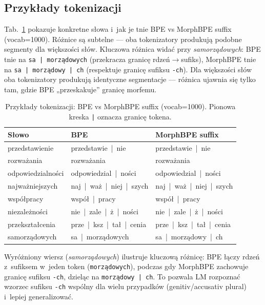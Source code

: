 \subsection*{Przykłady tokenizacji}
Tab.~\ref{tab:examples} pokazuje konkretne słowa i~jak je tnie
BPE vs MorphBPE suffix (vocab=1000). Różnice są subtelne --- oba
tokenizatory produkują podobne segmenty dla większości słów.
Kluczowa różnica widać przy \emph{samorządowych}:
BPE tnie na \texttt{sa~|~morządowych} (przekracza granicę
rdzeń$\to$sufiks), MorphBPE tnie na \texttt{sa~|~morządowy~|~ch}
(respektuje granicę sufiksu \texttt{-ch}).
Dla większości słów oba tokenizatory produkują identyczne segmentacje
--- różnica ujawnia się tylko tam, gdzie BPE „przeskakuje''
granicę morfemu.

\begin{table}[h]
  \centering
  \caption{Przykłady tokenizacji: BPE vs MorphBPE suffix (vocab=1000).
  Pionowa kreska \texttt{|} oznacza granicę tokena.}
  \label{tab:examples}
  \small
  \begin{tabular}{lll}
    \toprule
    Słowo & BPE & MorphBPE suffix \\
    \midrule
    przedstawienie   & przedstawie~|~nie       & przedstawie~|~nie \\
    rozważania       & rozważania              & rozważania \\
    odpowiedzialności & odpowiedzial~|~ności    & odpowiedzial~|~ności \\
    najważniejszych  & naj~|~waż~|~niej~|~szych & naj~|~waż~|~niej~|~szych \\
    współpracy       & współ~|~pracy           & współ~|~pracy \\
    niezależności    & nie~|~zale~|~ż~|~ności   & nie~|~zale~|~ż~|~ności \\
    przekształcenia  & prze~|~ksz~|~tał~|~cenia & prze~|~ksz~|~tał~|~cenia \\
    \rowcolor{slayergray}
    samorządowych    & sa~|~morządowych        & sa~|~morządowy~|~ch \\
    \bottomrule
  \end{tabular}
\end{table}

Wyróżniony wiersz (\emph{samorządowych}) ilustruje kluczową różnicę:
BPE łączy rdzeń z~sufiksem w~jeden token (\texttt{morządowych}),
podczas gdy MorphBPE zachowuje granicę sufiksu \texttt{-ch},
dzieląc na \texttt{morządowy~|~ch}. To pozwala LM rozpoznać
wzorzec sufiksu \texttt{-ch} wspólny dla wielu przypadków
(genitiv/accusativ plural) i~lepiej generalizować.

